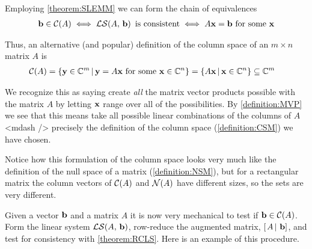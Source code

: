 \documentclass{ximera}
\begin{document}
Employing \ref{theorem:SLEMM} we can form the chain of equivalences
\begin{align*}
  \mathbf{b}\in\mathcal{C}\!\left(A\right)
  \iff
  \mathcal{LS}\!\left(A,\,\mathbf{b}\right)\text{ is consistent}
  \iff
  A\mathbf{x}=\mathbf{b}\text{ for some }\mathbf{x}
\end{align*}

Thus, an alternative (and popular) definition of the column space of an $m\times n$ matrix $A$ is
\begin{align*}
  \mathcal{C}\!\left(A\right)&=
           \left\lbrace
           \mathbf{y}\in\mathbb{C}^{m}
           \,\middle|\,
           \mathbf{y}=A\mathbf{x}\text{ for some }\mathbf{x}\in\mathbb{C}^{n}
           \right\rbrace
           =
           \left\lbrace A\mathbf{x}\,\middle|\,\mathbf{x}\in\mathbb{C}^{n}\right\rbrace
           \subseteq\mathbb{C}^{m}
\end{align*}

We recognize this as saying create \textit{all} the matrix vector
products possible with the matrix $A$ by letting $\mathbf{x}$ range over
all of the possibilities.  By \ref{definition:MVP} we see that this
means take all possible linear combinations of the columns of $A$
<mdash /> precisely the definition of the column space
(\ref{definition:CSM}) we have chosen.

Notice how this formulation of the column space looks very much like
the definition of the null space of a matrix (\ref{definition:NSM}),
but for a rectangular matrix the column vectors of $\mathcal{C}\!\left(A\right)$ and
$\mathcal{N}\!\left(A\right)$ have different sizes, so the sets are very different.

Given a vector $\mathbf{b}$ and a matrix $A$ it is now very mechanical
to test if $\mathbf{b}\in\mathcal{C}\!\left(A\right)$.  Form the linear system
$\mathcal{LS}\!\left(A,\,\mathbf{b}\right)$, row-reduce the augmented matrix,
$\left\lbrack\left.A\,\right\rvert\,\mathbf{b}\right\rbrack$, and test for consistency with
\ref{theorem:RCLS}.  Here is an example of this procedure.
\end{document}
